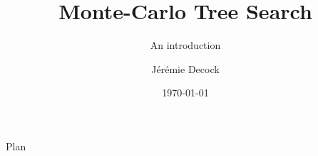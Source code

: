 \documentclass{beamer}
\title{Monte-Carlo Tree Search}
\subtitle{An introduction}
\author[Decock]{Jérémie Decock}
\date{\today}
\begin{document}
\begin{frame}
    \titlepage
\end{frame}


\begin{frame}{Plan}
    \tableofcontents
\end{frame}



\end{document}
